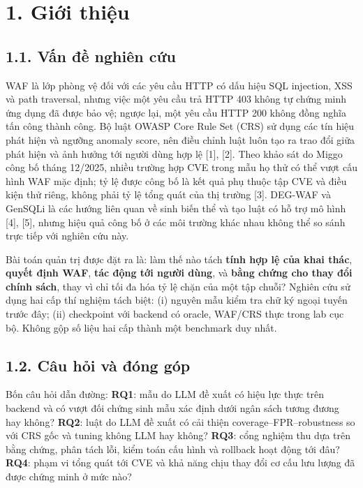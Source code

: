 \documentclass[
  10pt,
  a4paper,
]{article}
\begin{document}
\section{1. Giới thiệu}\label{giux1edbi-thiux1ec7u}

\subsection{1.1. Vấn đề nghiên
cứu}\label{vux1ea5n-ux111ux1ec1-nghiuxean-cux1ee9u}

WAF là lớp phòng vệ đối với các yêu cầu HTTP có dấu hiệu SQL injection,
XSS và path traversal, nhưng việc một yêu cầu trả HTTP 403 không tự
chứng minh ứng dụng đã được bảo vệ; ngược lại, một yêu cầu HTTP 200
không đồng nghĩa tấn công thành công. Bộ luật OWASP Core Rule Set (CRS)
sử dụng các tín hiệu phát hiện và ngưỡng anomaly score, nên điều chỉnh
luật luôn tạo ra trao đổi giữa phát hiện và ảnh hưởng tới người dùng hợp
lệ {[}1{]}, {[}2{]}. Theo khảo sát do Miggo công bố tháng 12/2025, nhiều
trường hợp CVE trong mẫu họ thử có thể vượt cấu hình WAF mặc định; tỷ lệ
được công bố là kết quả phụ thuộc tập CVE và điều kiện thử riêng, không
phải tỷ lệ tổng quát của thị trường {[}3{]}. DEG-WAF và GenSQLi là các
hướng liên quan về sinh biến thể và tạo luật có hỗ trợ mô hình {[}4{]},
{[}5{]}, nhưng hiệu quả công bố ở các môi trường khác nhau không thể so
sánh trực tiếp với nghiên cứu này.

Bài toán quản trị được đặt ra là: làm thế nào tách \textbf{tính hợp lệ
của khai thác}, \textbf{quyết định WAF}, \textbf{tác động tới người
dùng}, và \textbf{bằng chứng cho thay đổi chính sách}, thay vì chỉ tối
đa hóa tỷ lệ chặn của một tập chuỗi? Nghiên cứu sử dụng hai cấp thí
nghiệm tách biệt: (i) nguyên mẫu kiểm tra chữ ký ngoại tuyến trước đây;
(ii) checkpoint với backend có oracle, WAF/CRS thực trong lab cục bộ.
Không gộp số liệu hai cấp thành một benchmark duy nhất.

\subsection{1.2. Câu hỏi và đóng
góp}\label{cuxe2u-hux1ecfi-vuxe0-ux111uxf3ng-guxf3p}

Bốn câu hỏi dẫn đường: \textbf{RQ1}: mẫu do LLM đề xuất có hiệu lực thực
trên backend và có vượt đối chứng sinh mẫu xác định dưới ngân sách tương
đương hay không? \textbf{RQ2}: luật do LLM đề xuất có cải thiện
coverage--FPR--robustness so với CRS gốc và tuning không LLM hay không?
\textbf{RQ3}: cổng nghiệm thu dựa trên bằng chứng, phân tách lỗi, kiểm
toán cấu hình và rollback hoạt động tới đâu? \textbf{RQ4}: phạm vi tổng
quát tới CVE và khả năng chịu thay đổi cơ cấu lưu lượng đã được chứng
minh ở mức nào?
\end{document}
